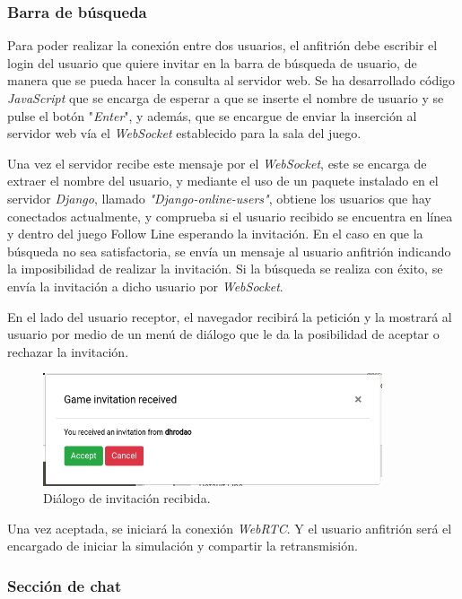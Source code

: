 \documentclass[a4paper, 12pt]{book}
\begin{document}
\subsubsection{Barra de búsqueda}

Para poder realizar la conexión entre dos usuarios, el anfitrión debe escribir el login del usuario que quiere invitar en la barra de búsqueda de usuario, de manera que se pueda hacer la consulta al servidor web. Se ha desarrollado código \emph{JavaScript} que se encarga de esperar a que se inserte el nombre de usuario y se pulse el botón "\emph{Enter}", y además, que se encargue de enviar la inserción al servidor web vía el \emph{WebSocket} establecido para la sala del juego.

Una vez el servidor recibe este mensaje por el \emph{WebSocket}, este se encarga de extraer el nombre del usuario, y mediante el uso de un paquete instalado en el servidor \emph{Django}, llamado \emph{"Django-online-users"}, obtiene los usuarios que hay conectados actualmente, y comprueba si el usuario recibido se encuentra en línea y dentro del juego Follow Line esperando la invitación. En el caso en que la búsqueda no sea satisfactoria, se envía un mensaje al usuario anfitrión indicando la imposibilidad de realizar la invitación. Si la búsqueda se realiza con éxito, se envía la invitación a dicho usuario por \emph{WebSocket}.

En el lado del usuario receptor, el navegador recibirá la petición y la mostrará al usuario por medio de un menú de diálogo que le da la posibilidad de aceptar o rechazar la invitación.
\begin{figure}[H]
	\centering
    \includegraphics[width=10cm]{img/invitation.png}
    \caption{Diálogo de invitación recibida.}
    \label{figura:diagrama_conexion_webrtc}
\end{figure}


Una vez aceptada, se iniciará la conexión \emph{WebRTC}. Y el usuario anfitrión será el encargado de iniciar la simulación y compartir la retransmisión.

\subsubsection{Sección de chat}
\end{document}
